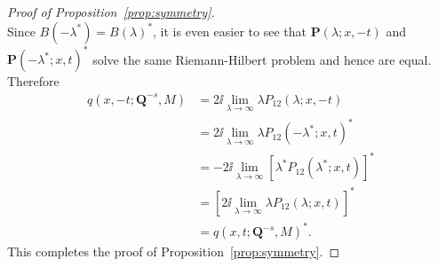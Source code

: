 \begin{proof}[Proof of Proposition~\ref{prop:symmetry}]
\begin{equation}
\end{equation}
Since 
$B(-\lambda^*)=B(\lambda)^*$,
it is even easier to see that $\mathbf{P}(\lambda;x,-t)$ and $\mathbf{P}(-\lambda^*;x,t)^*$ solve the same Riemann-Hilbert problem and hence are equal.  Therefore
\begin{equation}
\begin{split}
q(x,-t;\mathbf{Q}^{-s},M)&=2\ii\lim_{\lambda\to\infty}\lambda P_{12}(\lambda;x,-t)\\
&=2\ii\lim_{\lambda\to\infty}\lambda P_{12}(-\lambda^*;x,t)^*\\
&=-2\ii\lim_{\lambda\to\infty}\left[\lambda^* P_{12}(\lambda^*;x,t)\right]^*\\
&=\left[2\ii\lim_{\lambda\to\infty}\lambda P_{12}(\lambda;x,t)\right]^*\\
&=q(x,t;\mathbf{Q}^{-s},M)^*.
\end{split}
\end{equation}
This completes the proof of Proposition~\ref{prop:symmetry}.
\end{proof}

